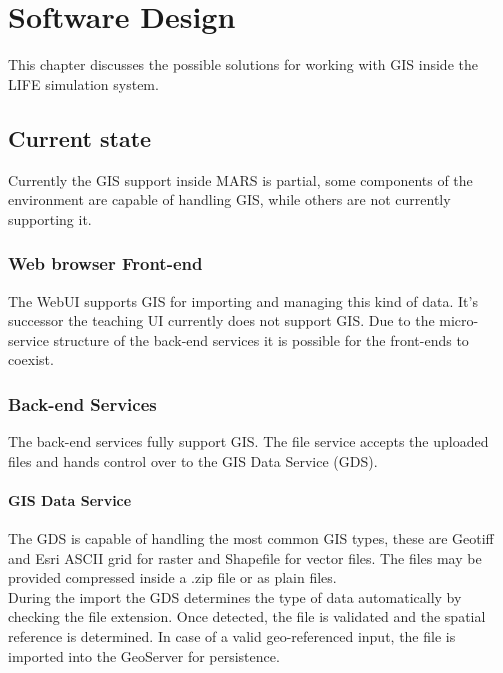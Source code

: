 
\chapter{Software Design}
This chapter discusses the possible solutions for working with GIS inside the LIFE simulation system.



\section{Current state}
Currently the GIS support inside MARS is partial, some components of the environment are capable of handling GIS, while others are not currently supporting it.


\subsection{Web browser Front-end}
The WebUI supports GIS for importing and managing this kind of data. It's successor the teaching UI currently does not support GIS. Due to the micro-service structure of the back-end services it is possible for the front-ends to coexist.

\subsection{Back-end Services}
The back-end services fully support GIS. The file service accepts the uploaded files and hands control over to the GIS Data Service (GDS). 

\subsubsection{GIS Data Service}
The GDS is capable of handling the most common GIS types, these are Geotiff and Esri ASCII grid for raster and Shapefile for vector files. The files may be provided compressed inside a .zip file or as plain files.\\
During the import the GDS determines the type of data automatically by checking the file extension. Once detected, the file is validated and the spatial reference is determined. In case of a valid geo-referenced input, the file is imported into the GeoServer for persistence.


